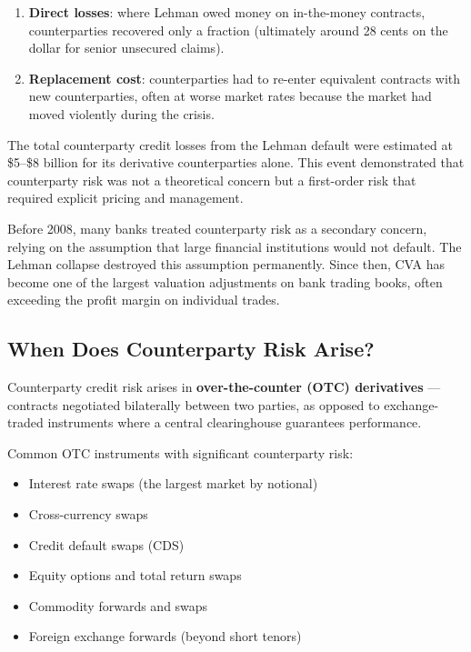 \documentclass[11pt, a4paper]{article}
\theoremstyle{definition}
\theoremstyle{plain}
\theoremstyle{remark}
\begin{document}
\begin{enumerate}
    \item \textbf{Direct losses}: where Lehman owed money on in-the-money contracts,
          counterparties recovered only a fraction (ultimately around 28 cents on the dollar
          for senior unsecured claims).
    \item \textbf{Replacement cost}: counterparties had to re-enter equivalent contracts
          with new counterparties, often at worse market rates because the market had moved
          violently during the crisis.
\end{enumerate}

The total counterparty credit losses from the Lehman default were estimated at
\$5--\$8 billion for its derivative counterparties alone.
This event demonstrated that counterparty risk was not a theoretical concern but a
first-order risk that required explicit pricing and management.

\begin{warningbox}
Before 2008, many banks treated counterparty risk as a secondary concern,
relying on the assumption that large financial institutions would not default.
The Lehman collapse destroyed this assumption permanently.
Since then, CVA has become one of the largest valuation adjustments on bank
trading books, often exceeding the profit margin on individual trades.
\end{warningbox}

\subsection{When Does Counterparty Risk Arise?}

Counterparty credit risk arises in \textbf{over-the-counter (OTC) derivatives} ---
contracts negotiated bilaterally between two parties, as opposed to
exchange-traded instruments where a central clearinghouse guarantees performance.

Common OTC instruments with significant counterparty risk:
\begin{itemize}
    \item Interest rate swaps (the largest market by notional)
    \item Cross-currency swaps
    \item Credit default swaps (CDS)
    \item Equity options and total return swaps
    \item Commodity forwards and swaps
    \item Foreign exchange forwards (beyond short tenors)
\end{itemize}
\end{document}
